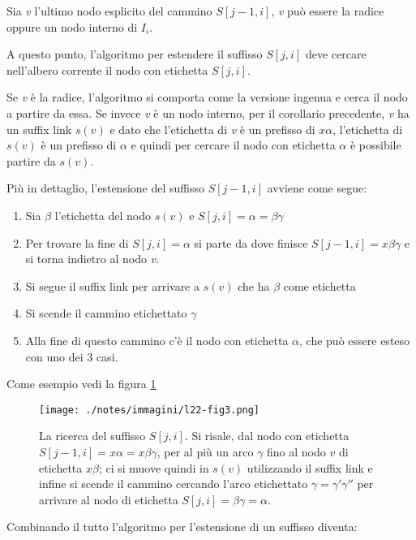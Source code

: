 Sia \textit{v} l'ultimo nodo esplicito del cammino $ S[j-1,i] $, \textit{v} può essere la radice oppure un nodo interno di $ I_i $.

A questo punto, l'algoritmo per estendere il suffisso $ S[j,i] $ deve cercare nell'albero corrente il nodo con etichetta $ S[j,i] $.

Se \textit{v} è la radice, l'algoritmo si comporta come la versione ingenua e cerca il nodo a partire da essa.
Se invece \textit{v} è un nodo interno, per il corollario precedente, \textit{v} ha un suffix link $ s(v) $ e dato che l'etichetta di \textit{v} è un prefisso di $ x\alpha $, l'etichetta di $ s(v) $ è un prefisso di $\alpha$ e quindi per cercare il nodo con etichetta $ \alpha $ è possibile partire da $ s(v) $.

Più in dettaglio, l'estensione del suffisso $ S[j-1,i] $ avviene come segue:

\begin{enumerate}
	\item Sia $\beta$ l'etichetta del nodo $ s(v) $ e $ S[j,i] = \alpha = \beta\gamma $
	\item Per trovare la fine di $ S[j,i] = \alpha $ si parte da dove finisce $ S[j-1,i] = x\beta\gamma $ e si torna indietro al nodo \textit{v}.
	\item Si segue il suffix link per arrivare a $s(v)$ che ha $\beta$ come etichetta
	\item Si scende il cammino etichettato $\gamma$
	\item Alla fine di questo cammino c'è il nodo con etichetta $\alpha$, che può essere esteso con uno dei 3 casi.
\end{enumerate}

Come esempio vedi la figura \ref{sadefe2}

\begin{figure}[htbp]
	\centering
	\texttt{[image: ./notes/immagini/l22-fig3.png]}
	\caption{La ricerca del suffisso $ S[j,i] $. Si risale, dal nodo con etichetta $ S[j-1,i] = x\alpha = x\beta\gamma $, per al più un arco $\gamma$ fino al nodo $ v $ di etichetta $ x\beta $; ci si muove quindi in $ s(v) $ utilizzando il suffix link e infine si scende il cammino cercando l'arco etichettato $\gamma = \gamma'\gamma''$ per arrivare al nodo di etichetta $ S[j,i] = \beta\gamma =\alpha$.}\label{sadefe2}
\end{figure}

Combinando il tutto l'algoritmo per l'estensione di un suffisso diventa:

